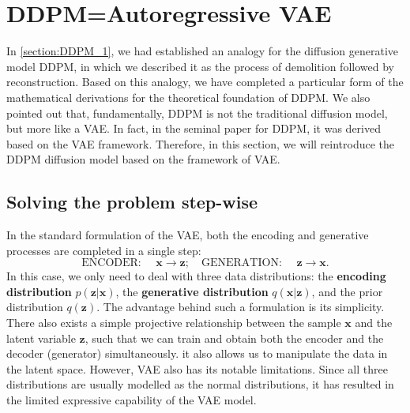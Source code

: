 \section{DDPM=Autoregressive VAE}\label{sect:2_VAE}

In \cref{section:DDPM_1}, we had established an analogy for the diffusion generative model DDPM, in which we described it as the process of demolition followed by reconstruction. Based on this analogy, we have completed a particular form of the mathematical derivations for the theoretical foundation of DDPM. We also pointed out that, fundamentally, DDPM is not the traditional diffusion model, but more like a VAE. In fact, in the seminal paper for DDPM\cite{ho2020denoising}, it was derived based on the VAE framework. Therefore, in this section, we will reintroduce the DDPM diffusion model based on the framework of VAE.

\subsection{Solving the problem step-wise}

In the standard formulation of the VAE,  both the encoding and generative processes are completed in a single step:
\begin{equation}
    \label{eq:2.1}
    \mbox{ENCODER: }\quad \bm{x}\to\bm{z};\quad\mbox{GENERATION: }\quad\bm{z}\to\bm{x}.
\end{equation}
In this case, we only need to deal with three data distributions: the \textbf{encoding distribution} $p(\bm{z}|\bm{x})$, the \textbf{generative distribution} $q(\bm{x}|\bm{z})$, and the prior distribution $q(\bm{z})$. The advantage behind such a formulation is its simplicity. There also exists a simple projective relationship between the sample $\bm{x}$ and the latent variable $\bm{z}$, such that we can train and obtain both the encoder and the decoder (generator) simultaneously. it also allows us to manipulate the data in the latent space. However, VAE also has its notable limitations. Since all three distributions are usually modelled as the normal distributions, it has resulted in the limited expressive capability of the VAE model. 

